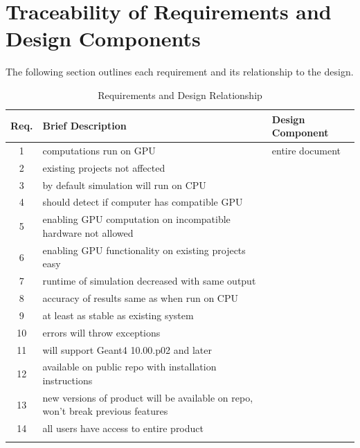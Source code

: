 \documentclass[12pt]{article}
\begin{document}
\section{Traceability of Requirements and Design Components}%
The following section outlines each requirement and its relationship to the design.

\begin{table}[h]
\centering
\caption{Requirements and Design Relationship}\label{Table_RequirementsAndDesign}
\begin{tabularx}{\textwidth}{cXX}

\toprule
\bf Req. & \bf Brief Description & \bf Design Component\\\midrule
\arrayrulecolor{lightgray}
1  & computations run on GPU & entire document\\\hline
2  & existing projects not affected & \\\hline
3  & by default simulation will run on CPU & \\\hline
4  & should detect if computer has compatible GPU & \\\hline
5  & enabling GPU computation on incompatible hardware not allowed & \\\hline
6  & enabling GPU functionality on existing projects easy & \\\hline
7 & runtime of simulation decreased with same output & \\\hline
8 & accuracy of results same as when run on CPU & \\\hline
9 & at least as stable as existing system & \\\hline
10 & errors will throw exceptions & \\\hline
11 & will support Geant4 10.00.p02 and later & \\\hline
12 & available on public repo with installation instructions & \\\hline
13 & new versions of product will be available on repo, won't break previous features & \\\hline
14 & all users have access to entire product & \\
\arrayrulecolor{black}
\bottomrule
\end{tabularx}
\end{table}
\end{document}
